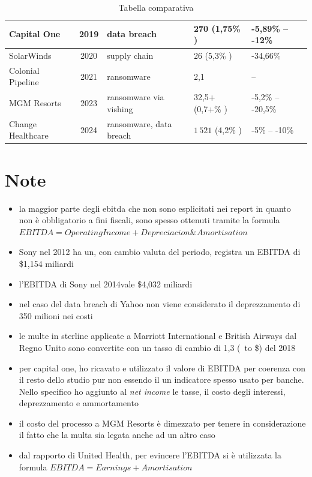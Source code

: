 \documentclass[12pt,a4paper,openright,twoside]{report}
\begin{document}
\begin{table}[H]
{\begin{tabular}{|p{}|c|p{3cm}|p{}|p{}|}
         \hline
         Capital One & 2019 & data breach & 270  (1,75\% \cite{capital_one_2019_10k}) & -5,89\% -- -12\% \\
         \hline
         SolarWinds & 2020 & supply chain & 26  (5,3\% \cite{solarwinds_2020_10k}) & -34,66\% \\
         \hline
        Colonial Pipeline & 2021 & ransomware & 2,1   & -- \\
         \hline
         MGM Resorts & 2023 & ransomware via vishing & 32,5+  (0,7+\% \cite{mgm_2023_10k}) &  -5,2\% -- -20,5\% \\
         \hline
         Change Healthcare & 2024 & ransomware, data breach & $1\,521$  (4,2\% \cite{unh_2024_10k}) & -5\% -- -10\% \\
         \hline
    \end{tabular}%
    }
    \caption{Tabella comparativa}
    \label{tab:analisys}
\end{table}

\section{Note} 
\begin{itemize}
    \item la maggior parte degli ebitda che non sono esplicitati nei report in quanto non \`e obbligatorio a fini fiscali, sono spesso ottenuti tramite  la formula $EBITDA = Operating Income + Depreciacion\&Amortisation$
    \item Sony nel 2012 ha un, con cambio valuta del periodo, registra un EBITDA di \$1,154 miliardi
    \item l'EBITDA di Sony nel 2014vale \$4,032 miliardi
    \item nel caso del data breach di Yahoo non viene considerato il deprezzamento di 350 milioni nei costi
    \item le multe in sterline applicate a  Marriott  International e
     British Airways dal Regno Unito sono convertite con un 
     tasso di cambio di 1,3 (\textsterling\ to \$) del 2018
    \item per capital one, ho ricavato e utilizzato il valore di 
    EBITDA per coerenza con il resto dello studio pur non essendo il
    un indicatore spesso usato per  banche. Nello specifico ho
    aggiunto al \textit{net income} le tasse, il costo degli interessi, deprezzamento e ammortamento
    \item il costo del processo a MGM Resorts \`e dimezzato per tenere
    in considerazione il fatto che la multa sia legata anche ad un altro caso
    \item dal rapporto di United Health, per evincere l'EBITDA si \`e 
    utilizzata la formula $ EBITDA = Earnings + Amortisation $
\end{itemize}
\end{document}
